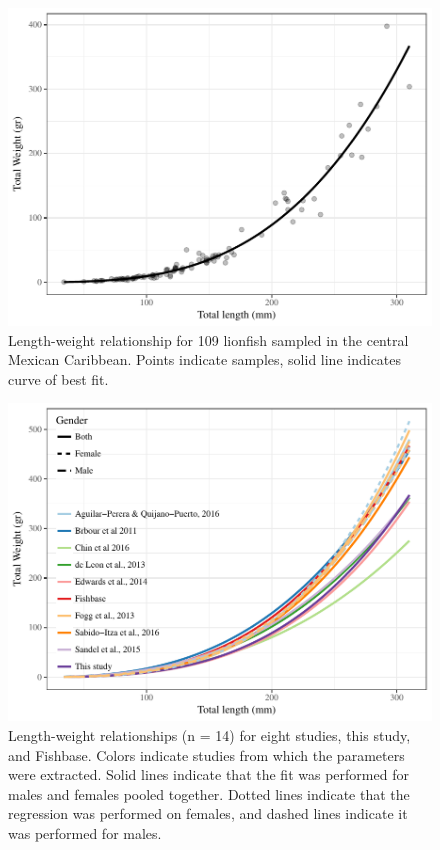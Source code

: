 \documentclass[12pt,]{article}
\begin{document}
\clearpage

\begin{figure}[htbp]
\centering
\includegraphics{Manuscript_files/figure-latex/unnamed-chunk-8-1.pdf}
\caption{Length-weight relationship for 109 lionfish sampled in the
central Mexican Caribbean. Points indicate samples, solid line indicates
curve of best fit.}
\end{figure}

\clearpage

\begin{figure}[htbp]
\centering
\includegraphics{Manuscript_files/figure-latex/unnamed-chunk-9-1.pdf}
\caption{Length-weight relationships (n = 14) for eight studies, this
study, and Fishbase. Colors indicate studies from which the parameters
were extracted. Solid lines indicate that the fit was performed for
males and females pooled together. Dotted lines indicate that the
regression was performed on females, and dashed lines indicate it was
performed for males.}
\end{figure}
\end{document}
